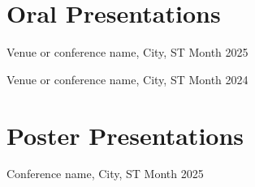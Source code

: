 %

\section{Oral Presentations}
\secstartswithlist{}%
\begin{etaremune}
\item
  Venue or conference name, City, ST
  \hfill{}
  Month 2025
\item
  Venue or conference name, City, ST
  \hfill{}
  Month 2024
\end{etaremune}

\section{Poster Presentations}
\secstartswithlist{}%
\begin{etaremune}
\item
  Conference name, City, ST
  \hfill{}
  Month 2025
\end{etaremune}


